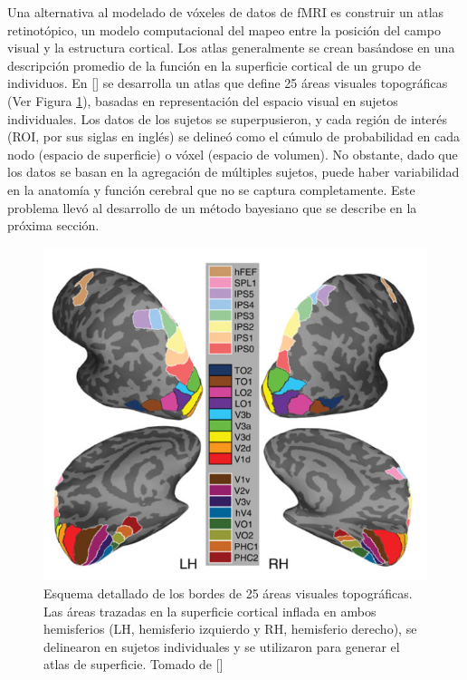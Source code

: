 Una alternativa al modelado de vóxeles de datos de fMRI es construir un atlas retinotópico, un modelo computacional del mapeo entre la posición del campo visual y la estructura cortical. Los atlas generalmente se crean basándose en una descripción promedio de la función en la superficie cortical de un grupo de individuos. En [\cite{wang_probabilistic_2015}] se desarrolla un atlas que define 25 \'areas visuales topogr\'aficas (Ver Figura \ref{fig:wang}), basadas en representación del espacio visual en sujetos individuales. Los datos de los sujetos se superpusieron, y cada regi\'on de inter\'es (ROI, por sus siglas en ingl\'es) se deline\'o como el c\'umulo de probabilidad en cada nodo (espacio de superficie) o v\'oxel (espacio de volumen). No obstante, dado que los datos se basan en la agregación de múltiples sujetos, puede haber variabilidad en la anatomía y función cerebral que no se captura completamente. Este problema llev\'o al desarrollo de un m\'etodo bayesiano que se describe en la pr\'oxima secci\'on.


\begin{figure}[h]
	\centering
	\includegraphics[scale=0.7]{Graphics/brain_wang}
	\caption{Esquema detallado de los bordes de 25 áreas visuales topográficas. Las áreas trazadas en la superficie cortical inflada en ambos hemisferios (LH, hemisferio izquierdo y RH, hemisferio derecho), se delinearon en sujetos individuales y se utilizaron para generar el atlas de superficie. Tomado de [\cite{wang_probabilistic_2015}]}
	\label{fig:wang}
\end{figure}



